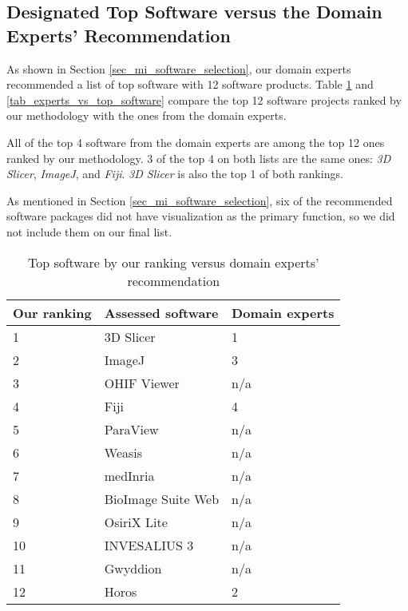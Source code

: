 \subsection{Designated Top Software versus the Domain Experts' Recommendation}
\label{sec_designation_vs_experts}

As shown in Section \ref{sec_mi_software_selection}, our domain experts recommended a list of top software with 12 software products. Table \ref{tab_top_software_vs_experts} and \ref{tab_experts_vs_top_software} compare the top 12 software projects ranked by our methodology with the ones from the domain experts.

All of the top 4 software from the domain experts are among the top 12 ones ranked by our methodology. 3 of the top 4 on both lists are the same ones: \textit{3D Slicer}, \textit{ImageJ}, and \textit{Fiji}. \textit{3D Slicer} is also the top 1 of both rankings.

As mentioned in Section \ref{sec_mi_software_selection}, six of the recommended software packages did not have visualization as the primary function, so we did not include them on our final list.

\begin{table}[H]
\centering
\begin{tabular}{lll}
\hline
Our ranking & Assessed software & Domain experts \\ \hline
1 & 3D Slicer & 1 \\
2 & ImageJ & 3 \\
3 & OHIF Viewer & n/a \\
4 & Fiji & 4 \\
5 & ParaView & n/a \\
6 & Weasis & n/a \\
7 & medInria & n/a \\
8 & BioImage Suite Web & n/a \\
9 & OsiriX Lite & n/a \\
10 & INVESALIUS 3 & n/a \\
11 & Gwyddion & n/a \\
12 & Horos & 2 \\ \hline
\end{tabular}
\caption{\label{tab_top_software_vs_experts}Top software by our ranking versus domain experts' recommendation}
\end{table}

